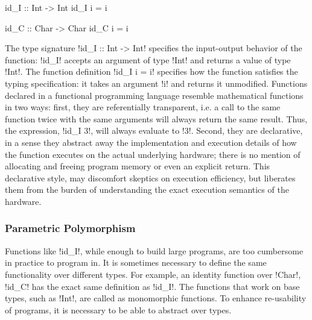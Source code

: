 \documentclass[manuscript,screen,nonacm]{acmart}
\begin{document}
\begin{minipage}{0.5\linewidth}
\begin{code}
            id_I :: Int -> Int
            id_I i = i
\end{code}
\end{minipage}%
\begin{minipage}{0.5\linewidth}
\begin{code}
            id_C :: Char -> Char
            id_C i = i
\end{code}
\end{minipage}

The type signature !id_I :: Int -> Int! specifies the input-output behavior of the function: !id_I! accepts an argument of type !Int! and returns a value of type !Int!. The function definition !id_I i = i! specifies how the function satisfies the typing specification: it takes an argument !i! and returns it unmodified. Functions declared in a functional programming language resemble mathematical functions in two ways: first, they are referentially transparent, i.e.  a call to the same function twice with the same arguments will always return the same result. Thus, the expression, !id_I 3!, will always evaluate to !3!. Second, they are declarative, in a sense they abstract away the implementation and execution details of how the function executes on the actual underlying hardware; there is no mention of allocating and freeing program memory or even an explicit return. This declarative style, may discomfort skeptics on execution efficiency, but liberates them from the burden of understanding the exact execution semantics of the hardware.

\subsubsection{Parametric Polymorphism}
Functions like !id_I!, while enough to build large programs, are too cumbersome in practice to program in. It is sometimes necessary to define the same functionality over different types. For example, an identity function over !Char!, !id_C! has the exact same definition as !id_I!. The functions that work on base types, such as !Int!, are called as monomorphic functions. To enhance re-usability of programs, it is necessary to be able to abstract over types.
\end{document}
